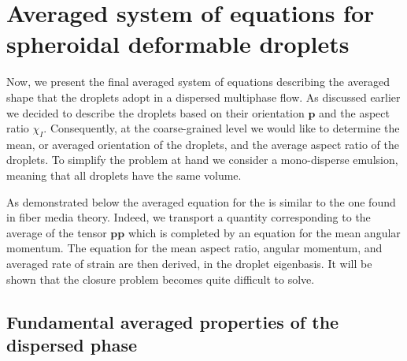 \section{Averaged system of equations for spheroidal deformable droplets}
\label{ap:averaged_eq_ellipsoidal}


Now, we present the final averaged system of equations describing the averaged shape that the droplets adopt in a dispersed multiphase flow. 
As discussed earlier we decided to describe the droplets based on their orientation $\textbf{p}$ and the aspect ratio $\chi_I$.
Consequently, at the coarse-grained level we would like to determine the mean, or averaged orientation of the droplets, and the average aspect ratio of the droplets.  
To simplify the problem at hand we consider a mono-disperse emulsion, meaning that all droplets have the same volume. 

As demonstrated below the averaged equation for the is similar to the one found in fiber media theory. 
Indeed, we transport a quantity corresponding to the average of the tensor $\textbf{pp}$ which is completed by an equation for the mean angular momentum. 
The equation for the mean aspect ratio, angular momentum, and averaged rate of strain are then derived, in the droplet eigenbasis.
It will be shown that the closure problem becomes quite difficult to solve. 

\subsection{Fundamental averaged properties of the dispersed phase} 

